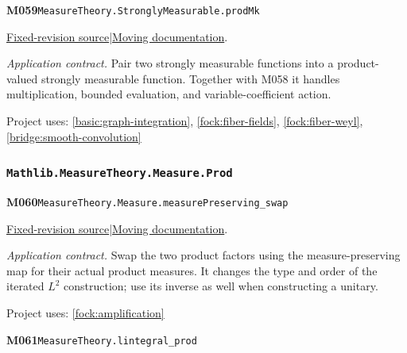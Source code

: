 \documentclass[11pt,a4paper]{article}
\theoremstyle{definition}
\theoremstyle{remark}
\begin{document}
\noindent\textbf{M059}\label{base:M059}\quad\nolinkurl{MeasureTheory.StronglyMeasurable.prodMk}

\href{https://github.com/leanprover-community/mathlib4/blob/9bac2d0692944a775113f7c130fd5e5b4608a854/Mathlib/MeasureTheory/Function/StronglyMeasurable/Basic.lean}{Fixed-revision source}\quad|\quad\href{https://leanprover-community.github.io/mathlib4_docs/Mathlib/MeasureTheory/Function/StronglyMeasurable/Basic.html#MeasureTheory.StronglyMeasurable.prodMk}{Moving documentation}.\par
\noindent\textit{Application contract.} Pair two strongly measurable functions into a product-valued strongly measurable function. Together with M058 it handles multiplication, bounded evaluation, and variable-coefficient action.\par
{\small Project uses: \ref{basic:graph-integration}, \ref{fock:fiber-fields}, \ref{fock:fiber-weyl}, \ref{bridge:smooth-convolution}}\par\medskip

\subsubsection*{\nolinkurl{Mathlib.MeasureTheory.Measure.Prod}}
\noindent\textbf{M060}\label{base:M060}\quad\nolinkurl{MeasureTheory.Measure.measurePreserving_swap}

\href{https://github.com/leanprover-community/mathlib4/blob/9bac2d0692944a775113f7c130fd5e5b4608a854/Mathlib/MeasureTheory/Measure/Prod.lean}{Fixed-revision source}\quad|\quad\href{https://leanprover-community.github.io/mathlib4_docs/Mathlib/MeasureTheory/Measure/Prod.html#MeasureTheory.Measure.measurePreserving_swap}{Moving documentation}.\par
\noindent\textit{Application contract.} Swap the two product factors using the measure-preserving map for their actual product measures. It changes the type and order of the iterated $L^2$ construction; use its inverse as well when constructing a unitary.\par
{\small Project uses: \ref{fock:amplification}}\par\medskip

\noindent\textbf{M061}\label{base:M061}\quad\nolinkurl{MeasureTheory.lintegral_prod}
\end{document}
